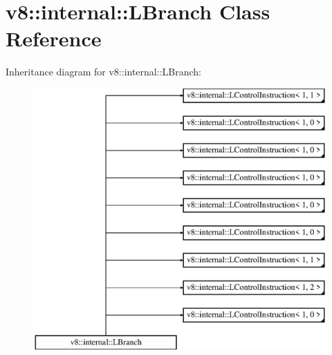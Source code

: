 \hypertarget{classv8_1_1internal_1_1_l_branch}{}\section{v8\+:\+:internal\+:\+:L\+Branch Class Reference}
\label{classv8_1_1internal_1_1_l_branch}
Inheritance diagram for v8\+:\+:internal\+:\+:L\+Branch\+:\begin{figure}[H]
\begin{center}
\leavevmode
\includegraphics[height=10.000000cm]{classv8_1_1internal_1_1_l_branch}
\end{center}
\end{figure}
